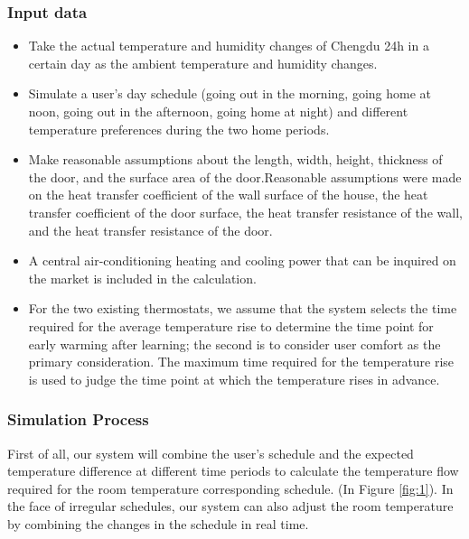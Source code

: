 \documentclass{mcmthesis}
\begin{document}
			\subsubsection{Input data}
				\begin{itemize}
					\item Take the actual temperature and humidity changes of Chengdu 24h in a certain day as the ambient temperature and humidity changes.
					
					\item Simulate a user's day schedule (going out in the morning, going home at noon, going out in the afternoon, going home at night) and different temperature preferences during the two home periods.
					
					\item Make reasonable assumptions about the length, width, height, thickness of the door, and the surface area of the door.Reasonable assumptions were made on the heat transfer coefficient of the wall surface of the house, the heat transfer coefficient of the door surface, the heat transfer resistance of the wall, and the heat transfer resistance of the door. 
					
					\item A central air-conditioning heating and cooling power that can be inquired on the market is included in the calculation.
					
					\item For the two existing thermostats, we assume that the system selects the time required for the average temperature rise to determine the time point for early warming after learning; the second is to consider user comfort as the primary consideration. The maximum time required for the temperature rise is used to judge the time point at which the temperature rises in advance.
					
				\end{itemize}
				
			\subsubsection{Simulation Process}
				First of all, our system will combine the user's schedule and the expected temperature difference at different time periods to calculate the temperature flow required for the room temperature corresponding schedule.	(In Figure \ref{fig:1}). In the face of irregular schedules, our system can also adjust the room temperature by combining the changes in the schedule in real time.
				
\end{document}
